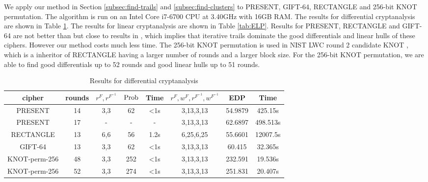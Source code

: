 We apply our method in Section \ref{subsec:find-trails} and \ref{subsec:find-clusters} to PRESENT, GIFT-64, RECTANGLE and 256-bit KNOT permutation. The algorithm is run on an Intel Core i7-6700 CPU at 3.40GHz with 16GB RAM. The results for differential cryptanalysis are shown in Table \ref{tab:EDP}. The results for linear cryptanalysis are shown in Table \ref{tab:ELP}. Results for PRESENT, RECTANGLE and GIFT-64 are not better than but close to results in \cite{HV18}, which implies that iterative trails dominate the good differentials and linear hulls of these ciphers. However our method costs much less time. The 256-bit KNOT permutation is used in NIST LWC round 2 candidate KNOT \cite{ZDY19}, which is a inheritor of RECTANGLE having a larger number of rounds and a larger block size. For the 256-bit KNOT permutation, we are able to find good differentials up to 52 rounds and good linear hulls up to 51 rounds. 

\begin{table}
	\caption{Results for differential cryptanalysis}\label{tab:EDP}
	\centering
	\begin{tabular}{|c|c|c|c|c|c|c|c|}
		\hline
		cipher & rounds & $r^F,r^{F^{-1}}$ & $\text{Prob}$ & Time & $r^F,w^F,r^{F^{-1}},w^{F^{-1}}$ & EDP & Time \\
		\hline
		PRESENT & 14 & 3,3 & 62 & <1s & 3,13,3,13 & 54.9879 & 425.15s \\
		\hline 
		PRESENT & 17 & - & - & - & 3,13,3,13 & 62.6897 & 498.513s\\
		\hline 
		RECTANGLE & 13 & 6,6 & 56 & 1.2s & 6,25,6,25 & 55.6601 & 12007.5s \\
		\hline
		GIFT-64 & 13 & 3,3 & 62 & <1s & 3,13,3,13 & 60.415 & 32.365s\\
		\hline
		KNOT-perm-256 & 48 & 3,3 & 252 & <1s & 3,13,3,13 & 232.591 & 19.536s\\
		\hline
		KNOT-perm-256 & 52 & 3,3 & 274 & <1s & 3,13,3,13 & 251.831 & 20.407s\\
		\hline
	\end{tabular}
\end{table}

